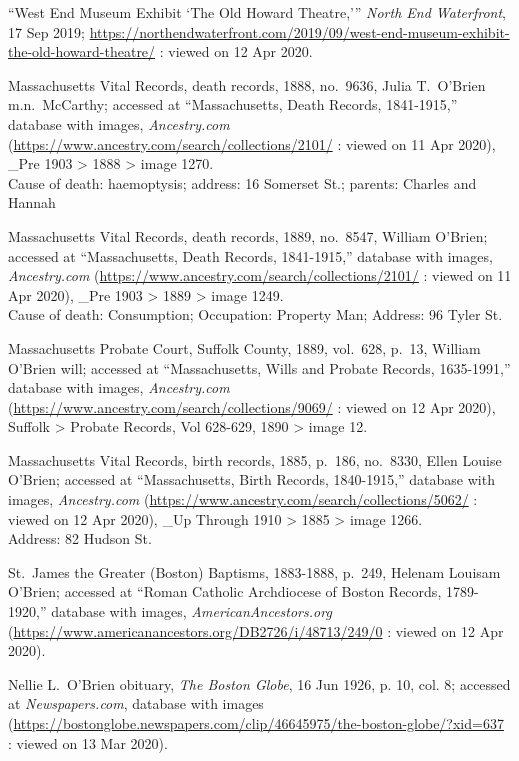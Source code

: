 \begin{thebibliography}{999}
``West End Museum Exhibit `The Old Howard Theatre,''' \textit{North End Waterfront}, 17 Sep 2019;  \url{https://northendwaterfront.com/2019/09/west-end-museum-exhibit-the-old-howard-theatre/} : viewed on 12 Apr 2020.

Massachusetts Vital Records, death records, 1888, no.\ 9636, Julia T.\ O'Brien m.n.\ McCarthy; accessed at ``Massachusetts, Death Records, 1841-1915,'' database with images, \textit{Ancestry.com} (\url{https://www.ancestry.com/search/collections/2101/} : viewed on 11 Apr 2020), \_Pre 1903 > 1888 > image 1270.\\
Cause of death: haemoptysis; address: 16 Somerset St.; parents: Charles and Hannah

Massachusetts Vital Records, death records, 1889, no.\ 8547, William O'Brien; accessed at ``Massachusetts, Death Records, 1841-1915,'' database with images, \textit{Ancestry.com} (\url{https://www.ancestry.com/search/collections/2101/} : viewed on 11 Apr 2020), \_Pre 1903 > 1889 > image 1249.\\
Cause of death: Consumption; Occupation: Property Man; Address: 96 Tyler St.

Massachusetts Probate Court, Suffolk County, 1889, vol.\ 628, p.\ 13, William O'Brien will; accessed at ``Massachusetts, Wills and Probate Records, 1635-1991,'' database with images, \textit{Ancestry.com} (\url{https://www.ancestry.com/search/collections/9069/} : viewed on 12 Apr 2020), Suffolk > Probate Records, Vol 628-629, 1890 > image 12.

Massachusetts Vital Records, birth records, 1885, p.\ 186, no.\ 8330, Ellen Louise O'Brien; accessed at ``Massachusetts, Birth Records, 1840-1915,'' database with images, \textit{Ancestry.com} (\url{https://www.ancestry.com/search/collections/5062/} : viewed on 12 Apr 2020), \_Up Through 1910 > 1885 > image 1266.\\
Address: 82 Hudson St.

St.\ James the Greater (Boston) Baptisms, 1883-1888, p.\ 249, Helenam Louisam O'Brien; accessed at ``Roman Catholic Archdiocese of Boston Records, 1789-1920,'' database with images, \textit{AmericanAncestors.org} (\url{https://www.americanancestors.org/DB2726/i/48713/249/0} : viewed on 12 Apr 2020).

Nellie L.\ O’Brien obituary, \textit{The Boston Globe}, 16 Jun 1926, p. 10, col. 8; accessed at \textit{Newspapers.com}, database with images (\url{https://bostonglobe.newspapers.com/clip/46645975/the-boston-globe/?xid=637} : viewed on 13 Mar 2020). 


\end{thebibliography}
